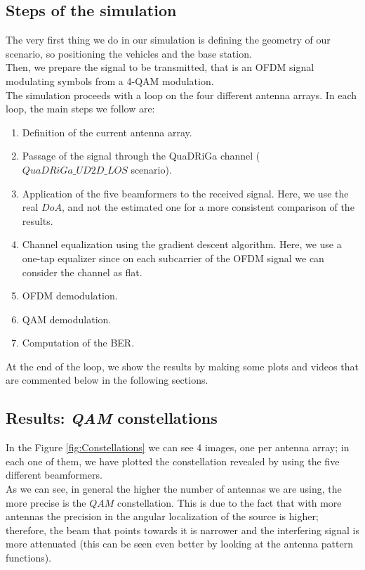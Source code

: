 \subsection{Steps of the simulation}

The very first thing we do in our simulation is defining the geometry of our scenario, so positioning the vehicles and the base station.\\
Then, we prepare the signal to be transmitted, that is an OFDM signal modulating symbols from a 4-QAM modulation.\\
The simulation proceeds with a loop on the four different antenna arrays. In each loop, the main steps we follow are:

\begin{enumerate}
    \item Definition of the current antenna array.
    \item Passage of the signal through the QuaDRiGa channel ($QuaDRiGa\_UD2D\_LOS$ scenario).
    \item Application of the five beamformers to the received signal. Here, we use the real $DoA$, and not the estimated one
            for a more consistent comparison of the results.
    \item Channel equalization using the gradient descent algorithm. Here, we use a one-tap equalizer since on each subcarrier 
            of the OFDM signal we can consider the channel as flat.
    \item OFDM demodulation.
    \item QAM demodulation.
    \item Computation of the BER.
\end{enumerate}

At the end of the loop, we show the results by making some plots and videos that are commented below in the following sections.

\subsection{Results: \textit{QAM} constellations}

In the Figure \ref{fig:Constellations} we can see 4 images, one per antenna array; in each one of them, we have
plotted the constellation revealed by using the five different beamformers. \\ 
As we can see, in general the higher the number of antennas we are using, the more precise is the $QAM$ constellation. This
is due to the fact that with more antennas the precision in the angular localization of the source is higher; therefore, 
the beam that points towards it is narrower and the interfering signal is more attenuated (this can be seen even better by
looking at the antenna pattern functions).


